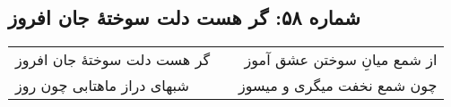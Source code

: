 \begin{center}
\section*{شماره ۵۸: گر هست دلت سوختۀ جان افروز}
\label{sec:058}
\begin{longtable}{l p{0.5cm} r}
گر هست دلت سوختهٔ جان افروز
&&
از شمع میانِ سوختن عشق آموز
\\
شبهای دراز ماهتابی چون روز
&&
چون شمع نخفت میگری و میسوز
\\
\end{longtable}
\end{center}
